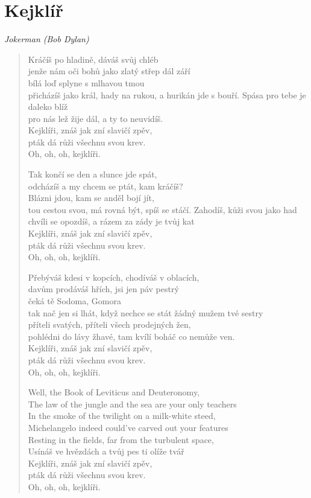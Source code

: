 \section*{Kejklíř}

\textit{Jokerman (Bob Dylan)}

\begin{verse}
Kráčíš po hladině, dáváš svůj chléb\\
jenže nám oči bohů jako zlatý střep dál září\\ 
bílá loď splyne s mlhavou tmou\\
přicházíš jako král, hady na rukou, a hurikán jde s bouří. 
Spása pro tebe je daleko blíž\\
pro nás lež žije dál, a ty to neuvidíš. \\
Kejklíři, znáš jak zní slavičí zpěv,\\
pták dá růži všechnu svou krev. \\
Oh, oh, oh, kejklíři.

Tak končí se den a slunce jde spát, \\
odcházíš a my chcem se ptát, kam kráčíš? \\
Blázni jdou, kam se anděl bojí jít, \\
tou cestou svou, má rovná být, spíš se stáčí.
Zahodíš, kůži svou jako had \\
chvíli se opozdíš, a rázem za zády je tvůj kat \\
Kejklíři, znáš jak zní slavičí zpěv,\\
pták dá růži všechnu svou krev. \\
Oh, oh, oh, kejklíři.

Přebýváš kdesi v kopcích, chodíváš v oblacích, \\
davům prodáváš hřích, jsi jen páv pestrý \\
čeká tě Sodoma, Gomora \\
tak nač jen si lhát, když nechce se stát žádný mužem tvé sestry  \\
příteli svatých, příteli všech prodejných žen, \\
pohlédni do lávy žhavé, tam kvílí boháč co nemůže ven. \\
Kejklíři, znáš jak zní slavičí zpěv,\\
pták dá růži všechnu svou krev. \\
Oh, oh, oh, kejklíři.

Well, the Book of Leviticus and Deuteronomy, \\
The law of the jungle and the sea are your only teachers \\
In the smoke of the twilight on a milk-white steed, \\
Michelangelo indeed could've carved out your features \\
Resting in the fields, far from the turbulent space, \\
Usínáš ve hvězdách a tvůj pes ti olíže tvář \\
Kejklíři, znáš jak zní slavičí zpěv,\\
pták dá růži všechnu svou krev. \\
Oh, oh, oh, kejklíři.


\end{verse}
